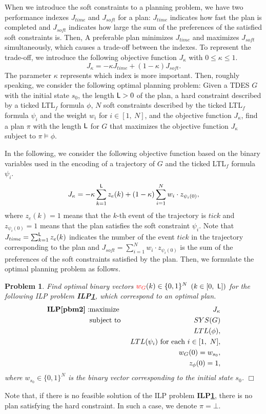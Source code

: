 \documentclass[journal,twoside,web]{IEEEtran}
\newcommand{\qedwhite}{\hfill \ensuremath{\Box}}
\newtheorem{pbm}{Problem}
\newcommand{\Len}{{\sf L}}
\newcommand{\red}[1]{\textcolor{red}{#1}}
\begin{document}
When we introduce the soft constraints to a planning problem, we have two performance indexes $J_{time}$ and $J_{soft}$ for a plan: $J_{time}$ indicates how fast the plan is completed and $J_{soft}$ indicates how large the sum of the preferences of the satisfied soft constraints is.
Then, A preferable plan minimizes $J_{time}$ and maximizes $J_{soft}$ simultaneously, which causes a trade-off between the indexes. To represent the trade-off, we introduce the following objective function $J_{\kappa}$ with $0 \leq \kappa \leq 1$.
\begin{equation}
J_{\kappa}=-\kappa J_{time} + (1-\kappa) J_{soft}.
\end{equation}
The parameter $\kappa$ represents which index is more important.
Then, roughly speaking, we consider the following optimal planning problem:
Given a TDES $G$ with the initial state $s_0$, the length $\Len>0$ of the plan,  a hard constraint described by a ticked LTL$_f$ formula $\phi$, $N$ soft constraints described by the ticked LTL$_f$ formula $\psi_{i}$ and the weight $w_i$ for $i\in[1,\ N]$, and the objective function $J_\kappa$,
find a plan $\pi$ with the length $\Len$ for $G$ that maximizes the objective function $J_{\kappa}$ subject to $\pi \models \phi$.

In the following, we consider the following objective function based on the binary variables used in the encoding of a trajectory of $G$ and the ticked LTL$_f$ formula $\psi_{i}$.
\begin{align}\label{j1}
J_\kappa= 
-\kappa\sum_{k=1}^{\Len}z_e(k) + (1-\kappa)\sum_{i=1}^{N} w_{i}\cdot z_{\psi_{i}(0)}, 
\end{align}
where $z_e(k)=1$ means that the $k$-th event of the trajectory is $tick$ and $z_{\psi_{i}(0)}=1$ means that the plan satisfies the soft constraint $\psi_{i}$.
Note that $J_{time}=\sum_{k=1}^{\Len}z_e(k)$ indicates the number of the event $tick$ in the trajectory corresponding to the plan and
$J_{soft}=\sum_{i=1}^{N} w_{i}\cdot z_{\psi_{i}(0)}$ is the sum of the preferences of the soft constraints satisfied by the plan.
Then, we formulate the optimal planning problem as follows.


%
\begin{pbm}\label{pbm2}
Find optimal binary vectors $\red{w_G}(k) \in \{0, 1 \}^N$ \red{$(k\in[0,~ \Len])$} for the following ILP problem {\bf ILP\ref{pbm2}}, which correspond to an optimal plan.
\begin{eqnarray}
\mbox{\bf ILP\ref{pbm2}}: &\mbox{maximize }&J_\kappa \notag \\
&\mbox{subject to }&SYS(G) \notag \\
&& LTL(\phi),\notag \\
&& LTL(\psi_i) \  {\rm{for\ each\ }}  i \in [1,\ N], \notag\\
&& w_G(0)=w_{s_0}, \notag \\
&&z_{\phi} (0) = 1, \notag
\end{eqnarray}
where $w_{s_0} \in \{0, 1 \}^N$ is the binary vector corresponding to the initial state $s_0$.
\qedwhite
\end{pbm}
%
Note that, if there is no feasible solution of the ILP problem  {\bf ILP\ref{pbm2}}, there is no plan satisfying the hard constraint.  In such a case, we denote $\pi=\bot$.
%
\end{document}
